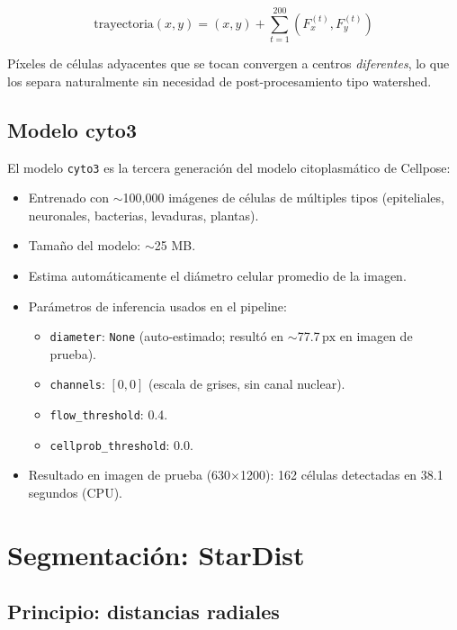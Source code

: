 \documentclass[11pt,a4paper]{article}
\newcommand{\px}{\,\text{px}}
\begin{document}
\begin{equation}
  \text{trayectoria}(x, y) = (x, y) + \sum_{t=1}^{200} \left( F_x^{(t)}, F_y^{(t)} \right)
\end{equation}

P\'{i}xeles de c\'{e}lulas adyacentes que se tocan convergen a centros \textit{diferentes}, lo que los separa naturalmente sin necesidad de post-procesamiento tipo watershed.

\subsection{Modelo cyto3}

El modelo \texttt{cyto3} es la tercera generaci\'{o}n del modelo citoplasm\'{a}tico de Cellpose:

\begin{itemize}
  \item Entrenado con $\sim$100{,}000 im\'{a}genes de c\'{e}lulas de m\'{u}ltiples tipos (epiteliales, neuronales, bacterias, levaduras, plantas).
  \item Tama\~{n}o del modelo: $\sim$25 MB.
  \item Estima autom\'{a}ticamente el di\'{a}metro celular promedio de la imagen.
  \item Par\'{a}metros de inferencia usados en el pipeline:
  \begin{itemize}
    \item \texttt{diameter}: \texttt{None} (auto-estimado; result\'{o} en $\sim$77.7$\px$ en imagen de prueba).
    \item \texttt{channels}: $[0, 0]$ (escala de grises, sin canal nuclear).
    \item \texttt{flow\_threshold}: 0.4.
    \item \texttt{cellprob\_threshold}: 0.0.
  \end{itemize}
  \item Resultado en imagen de prueba (630$\times$1200): 162 c\'{e}lulas detectadas en 38.1 segundos (CPU).
\end{itemize}

\section{Segmentaci\'{o}n: StarDist}
\label{sec:stardist}

\subsection{Principio: distancias radiales}
\end{document}
